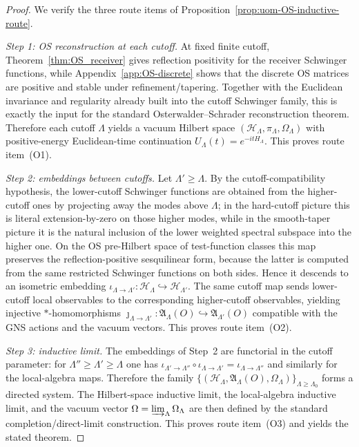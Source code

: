 \documentclass[10pt]{article}
\theoremstyle{definition}
\theoremstyle{plain}
\begin{document}
\begin{proof}
We verify the three route items of Proposition~\ref{prop:uom-OS-inductive-route}.

\emph{Step 1: OS reconstruction at each cutoff.}
At fixed finite cutoff, Theorem~\ref{thm:OS_receiver} gives reflection positivity for the receiver Schwinger functions, while
Appendix~\ref{app:OS-discrete} shows that the discrete OS matrices are positive and stable under refinement/tapering.  Together with the
Euclidean invariance and regularity already built into the cutoff Schwinger family, this is exactly the input for the standard
Osterwalder--Schrader reconstruction theorem.  Therefore each cutoff $\Lambda$ yields a vacuum Hilbert space
\((\mathcal H_\Lambda,\pi_\Lambda,\Omega_\Lambda)\) with positive-energy Euclidean-time continuation
\(U_\Lambda(t)=e^{-itH_\Lambda}\).  This proves route item~\textnormal{(O1)}.

\emph{Step 2: embeddings between cutoffs.}
Let $\Lambda'\ge\Lambda$.  By the cutoff-compatibility hypothesis, the lower-cutoff Schwinger functions are obtained from the higher-cutoff ones
by projecting away the modes above $\Lambda$; in the hard-cutoff picture this is literal extension-by-zero on those higher modes, while in the
smooth-taper picture it is the natural inclusion of the lower weighted spectral subspace into the higher one.  On the OS pre-Hilbert space of
test-function classes this map preserves the reflection-positive sesquilinear form, because the latter is computed from the same restricted
Schwinger functions on both sides.  Hence it descends to an isometric embedding
\(
\iota_{\Lambda\to\Lambda'}:\mathcal H_\Lambda\hookrightarrow\mathcal H_{\Lambda'}
\).
The same cutoff map sends lower-cutoff local observables to the corresponding higher-cutoff observables, yielding injective
$*$-homomorphisms
\(
\jmath_{\Lambda\to\Lambda'}:\mathfrak A_\Lambda(O)\hookrightarrow\mathfrak A_{\Lambda'}(O)
\)
compatible with the GNS actions and the vacuum vectors.  This proves route item~\textnormal{(O2)}.

\emph{Step 3: inductive limit.}
The embeddings of Step~2 are functorial in the cutoff parameter: for $\Lambda''\ge\Lambda'\ge\Lambda$ one has
\(
\iota_{\Lambda'\to\Lambda''}\circ \iota_{\Lambda\to\Lambda'}=\iota_{\Lambda\to\Lambda''}
\)
and similarly for the local-algebra maps.  Therefore the family
\(
\{(\mathcal H_\Lambda,\mathfrak A_\Lambda(O),\Omega_\Lambda)\}_{\Lambda\ge\Lambda_0}
\)
forms a directed system.  The Hilbert-space inductive limit, the local-algebra inductive limit, and the vacuum vector
\(
\Omega=\varinjlim_\Lambda \Omega_\Lambda
\)
are then defined by the standard completion/direct-limit construction.  This proves route item~\textnormal{(O3)} and yields the stated theorem.
\end{proof}
\end{document}
